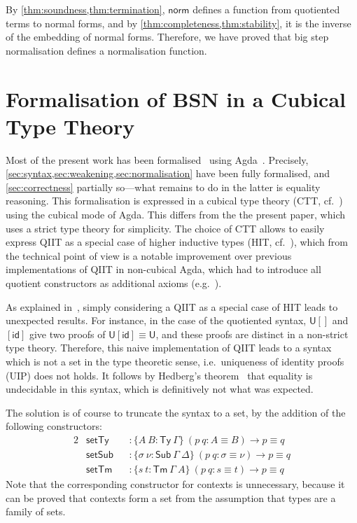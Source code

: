 \documentclass[a4paper,UKenglish,cleveref]{lipics-v2019}
\newcommand{\agdaSymb}[1]{\mathsf{#1}}
\newcommand{\Ty}{\agdaSymb{Ty}}
\newcommand{\Tms}{\agdaSymb{Sub}}
\newcommand{\Tm}{\agdaSymb{Tm}}
\newcommand{\id}{\agdaSymb{id}}
\newcommand{\norm}{\agdaSymb{norm}}
\newcommand{\U}{\agdaSymb{U}}
\newcommand{\isSet}{\agdaSymb{set}}
\begin{document}
By \cref{thm:soundness,thm:termination}, $\norm$ defines a
function from quotiented terms to normal forms, and by
\cref{thm:completeness,thm:stability}, it is the inverse of
the embedding of normal forms. Therefore, we have proved that big step
normalisation defines a normalisation function.

\section{Formalisation of BSN in a Cubical Type Theory}
\label{sec:cubical}
Most of the present work has been formalised~\cite{formalisation} using
Agda~\cite{norell2007agda}. Precisely, \cref{sec:syntax,sec:weakening,sec:normalisation}
have been fully formalised, and \cref{sec:correctness} partially so---what
remains to do in the latter is equality reasoning.
This formalisation is expressed in a cubical type theory (CTT, cf.~\cite{cchm})
using the cubical mode of Agda. This differs from the the present paper, which
uses a strict type theory for simplicity. The choice of CTT allows to easily
express QIIT as a special case of higher inductive types (HIT, cf.~\cite{hott}),
which from the technical point of view is a notable improvement over previous
implementations of QIIT in non-cubical Agda, which had to introduce all quotient
constructors as additional axioms (e.g.~\cite{kaposi2016normalisation,kaposi2016type}).

As explained in~\cite{kaposi2016type}, simply considering a QIIT as a special
case of HIT leads to unexpected results. For instance, in the case of the
quotiented syntax, $\U[]$ and $[\id]$ give two proofs of $\U[\id] \equiv \U$,
and these proofs are distinct in a non-strict type theory. Therefore, this naive
implementation of QIIT leads to a syntax which is not a set in the type theoretic
sense, i.e.\ uniqueness of identity proofs (UIP) does not holds.
It follows by Hedberg's theorem~\cite{hedberg1998coherence} that equality is
undecidable in this syntax, which is definitively not what was expected.

The solution is of course to truncate the syntax to a set, by the addition of
the following constructors:
\begin{alignat*}{2}
  & \isSet\Ty && : \{A\ B : \Ty\ \Gamma\}\ (p\ q : A \equiv B) \to p \equiv q \\
  & \isSet\Tms && : \{\sigma\ \nu : \Tms\ \Gamma\ \Delta\}\ (p\ q : \sigma \equiv \nu) \to p \equiv q \\
  & \isSet\Tm && : \{s\ t : \Tm\ \Gamma\ A\}\ (p\ q : s \equiv t) \to p \equiv q
\end{alignat*}
Note that the corresponding constructor for contexts is unnecessary, because
it can be proved that contexts form a set from the assumption that types are a
family of sets.
\end{document}
